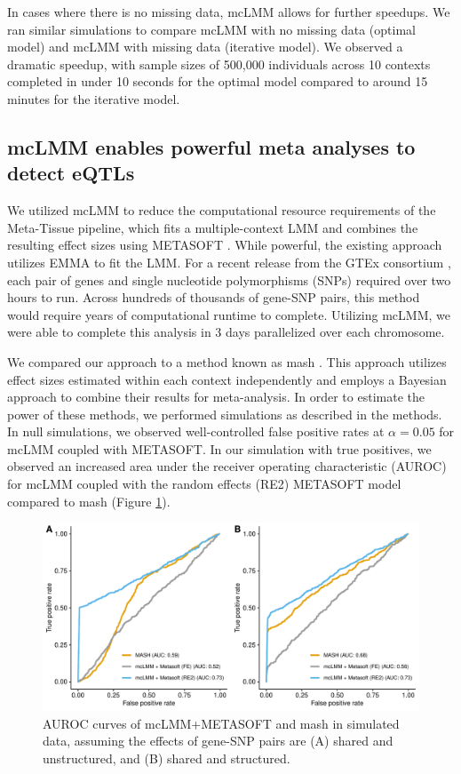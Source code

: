         In cases where there is no missing data, mcLMM allows for further speedups. We ran similar simulations to compare mcLMM with no missing data (optimal model) and mcLMM with missing data (iterative model). We observed a dramatic speedup, with sample sizes of 500,000 individuals across 10 contexts completed in under 10 seconds for the optimal model compared to around 15 minutes for the iterative model.
    
    \subsection{mcLMM enables powerful meta analyses to detect eQTLs}
        We utilized mcLMM to reduce the computational resource requirements of the Meta-Tissue pipeline, which fits a multiple-context LMM and combines the resulting effect sizes using METASOFT \cite{Sul}. While powerful, the existing approach utilizes EMMA to fit the LMM. For a recent release from the GTEx consortium  \cite{GTEx_Consortium2020-xx}, each pair of genes and single nucleotide polymorphisms (SNPs) required over two hours to run. Across hundreds of thousands of gene-SNP pairs, this method would require years of computational runtime to complete. Utilizing mcLMM, we were able to complete this analysis in 3 days parallelized over each chromosome. 
        
        We compared our approach to a method known as mash \cite{Urbut2019}. This approach utilizes effect sizes estimated within each context independently and employs a Bayesian approach to combine their results for meta-analysis. In order to estimate the power of these methods, we performed simulations as described in the methods. In null simulations, we observed well-controlled false positive rates at $\alpha = 0.05$ for mcLMM coupled with METASOFT. In our simulation with true positives, we observed an increased area under the receiver operating characteristic (AUROC) for mcLMM coupled with the random effects (RE2) METASOFT model compared to mash (Figure \ref{fig:fig2}).
        
        \begin{figure}
            \centering
            \includegraphics[width=\textwidth]{chapter3/figures/Figure_2.pdf}
            \caption{AUROC curves of mcLMM+METASOFT and mash in simulated data, assuming the effects of gene-SNP pairs are (A) shared and unstructured, and (B) shared and structured.}
            \label{fig:fig2}
        \end{figure}

